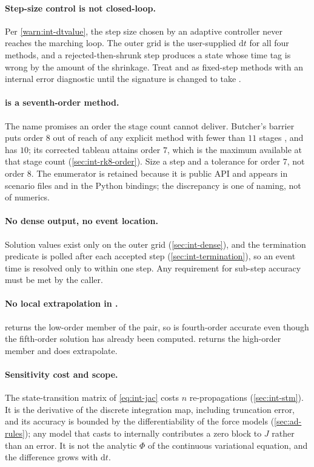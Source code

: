 \paragraph{Step-size control is not closed-loop.}
Per \cref{warn:int-dtvalue}, the step size chosen by an adaptive controller
never reaches the marching loop. The outer grid is the user-supplied
$\mathrm{d}t$ for all four methods, and a rejected-then-shrunk step produces a
state whose time tag is wrong by the amount of the shrinkage. Treat
 and  as fixed-step methods with an internal error
diagnostic until the signature is changed to take .

\paragraph{ is a seventh-order method.}
The name promises an order the stage count cannot deliver. Butcher's barrier
puts order $8$ out of reach of any explicit method with fewer than $11$ stages
\citep[Thm.~II.5.1]{hairer1993}, and  has $10$; its corrected tableau
attains order $7$, which is the maximum available at that stage count
(\cref{sec:int-rk8-order}). Size a step and a tolerance for order $7$, not
order $8$. The enumerator  is retained because it is
public API and appears in scenario files and in the Python bindings; the
discrepancy is one of naming, not of numerics.

\paragraph{No dense output, no event location.}
Solution values exist only on the outer grid (\cref{sec:int-dense}), and the
termination predicate is polled after each accepted step
(\cref{sec:int-termination}), so an event time is resolved only to within one
step. Any requirement for sub-step accuracy must be met by the caller.

\paragraph{No local extrapolation in .}
 returns the low-order member of the pair, so  is
fourth-order accurate even though the fifth-order solution has already been
computed.  returns the high-order member and does extrapolate.

\paragraph{Sensitivity cost and scope.}
The state-transition matrix of \cref{eq:int-jac} costs $n$ re-propagations
(\cref{sec:int-stm}). It is the derivative of the discrete integration map,
including truncation error, and its accuracy is bounded by the
differentiability of the force models (\cref{sec:ad-rules}); any model that
casts to  internally contributes a zero block to $J$ rather than an
error. It is not the analytic $\Phi$ of the continuous variational equation,
and the difference grows with $\mathrm{d}t$.

